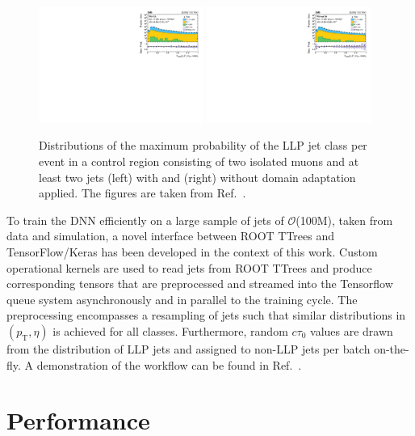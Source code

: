 \documentclass{webofc}
\newcommand{\ctau}{\ensuremath{c\tau_{0}}\xspace}
\newcommand{\pt}{\ensuremath{p_\textrm{T}}\xspace}
\begin{document}
\begin{figure}[!ht]
\includegraphics[width=0.48\textwidth]{figs/2mu_2toNj__llpdnnx_da_0_max_highpt.pdf}\hspace{0.03\textwidth}
\includegraphics[width=0.48\textwidth]{figs/2mu_2toNj__llpdnnx_noda_0_max_highpt.pdf}
\centering
\caption{Distributions of the maximum probability of the LLP jet class per event in a control region consisting of two isolated muons and at least two jets (left) with and (right) without domain adaptation applied. The figures are taken from Ref.~\cite{CMS-EXO-19-011}.}
\label{da}
\end{figure}

To train the DNN efficiently on a large sample of jets of $\mathcal{O}$(100M), taken from data and simulation, a novel interface between ROOT TTrees and TensorFlow/Keras has been developed in the context of this work. Custom operational kernels are used to read jets from ROOT TTrees and produce corresponding tensors that are preprocessed and streamed into the Tensorflow queue system asynchronously and in parallel to the training cycle. The preprocessing encompasses a resampling of jets such that similar distributions in $(\pt,\eta)$ is achieved for all classes. Furthermore, random \ctau values are drawn from the distribution of LLP jets and assigned to non-LLP jets per batch on-the-fly. A demonstration of the workflow can be found in Ref.~\cite{code}.

\section{Performance}
\label{peformance}
\end{document}
